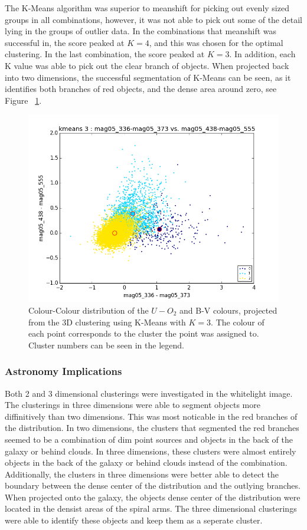 The K-Means algorithm was superior to meanshift for picking out evenly sized groups in all combinations, however, it was not able to pick out some of the detail lying in the groups of outlier data. 
In the combinations that meanshift was successful in, the score peaked at $K=4$, and this was chosen for the optimal clustering. In the last combination, the score peaked at $K=3$.
In addition, each K value was able to pick out the clear branch of objects.
When projected back into two dimensions, the successful segmentation of K-Means can be seen, as it identifies both branches of red objects, and the dense area around zero, see Figure ~\ref{fig:UOIIKM2d}.

\begin{figure}
\centering
\includegraphics[width=\linewidth]{figs/kmeans_base_color_3cl_mag05_336-mag05_373vsmag05_438-mag05_555}
\caption{Colour-Colour distribution of the $U-O_{2}$ and B-V colours, projected from the 3D clustering using K-Means with $K=3$. The colour of each point corresponds to the cluster the point was assigned to. Cluster numbers can be seen in the legend.}
\label{fig:UOIIKM2d}
\end{figure}

\subsubsection{Astronomy Implications}
Both 2 and 3 dimensional clusterings were investigated in the whitelight image. 
The clusterings in three dimensions were able to segment objects more diffinitively than two dimensions.
This was most noticable in the red branches of the distribution.
In two dimensions, the clusters that segmented the red branches seemed to be a combination of dim point sources and objects in the back of the galaxy or behind clouds.
In three dimensions, these clusters were almost entirely objects in the back of the galaxy or behind clouds instead of the combination.
Additionally, the clusters in three dimensions were better able to detect the boundary between the dense center of the distribution and the outlying branches.
When projected onto the galaxy, the objects dense center of the distribution were located in the densist areas of the spiral arms.
The three dimensional clusterings were able to identify these objects and keep them as a seperate cluster.

